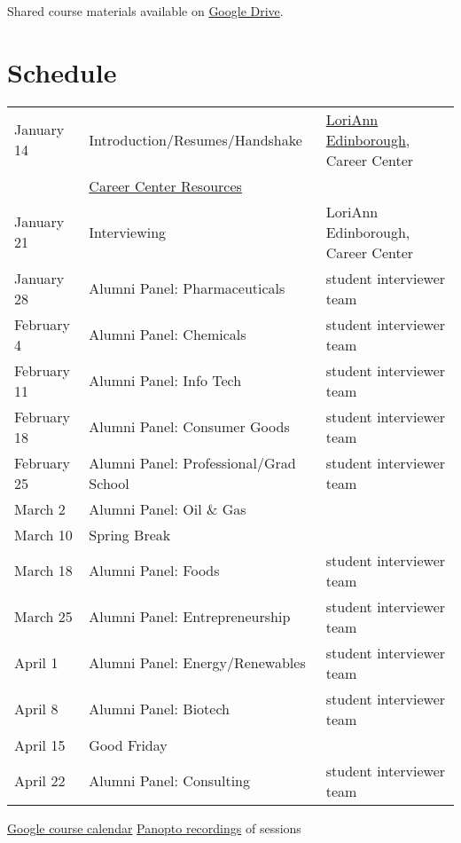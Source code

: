 \documentclass[11pt]{article}
\begin{document}
Shared course materials available on \href{https://drive.google.com/drive/folders/12p1B5icXV4FetwMoPTR7hkxTTPMj53qA?usp=sharing}{Google Drive}.

\section{Schedule}
\label{sec:orgf7111d6}
\begin{center}
\begin{tabular}{lll}
January 14 & Introduction/Resumes/Handshake & \href{https://www.linkedin.com/in/loriann-edinborough/}{LoriAnn Edinborough}, Career Center\\
 & \href{./Resources/Career-Center-Resources.pdf}{Career Center Resources} & \\
January 21 & Interviewing & LoriAnn Edinborough, Career Center\\
January 28 & Alumni Panel: Pharmaceuticals & student interviewer team\\
February 4 & Alumni Panel: Chemicals & student interviewer team\\
February 11 & Alumni Panel: Info Tech & student interviewer team\\
February 18 & Alumni Panel: Consumer Goods & student interviewer team\\
February 25 & Alumni Panel: Professional/Grad School & student interviewer team\\
March 2 & Alumni Panel: Oil \& Gas & \\
March 10 & Spring Break & \\
March 18 & Alumni Panel: Foods & student interviewer team\\
March 25 & Alumni Panel: Entrepreneurship & student interviewer team\\
April 1 & Alumni Panel: Energy/Renewables & student interviewer team\\
April 8 & Alumni Panel: Biotech & student interviewer team\\
April 15 & Good Friday & \\
April 22 & Alumni Panel: Consulting & student interviewer team\\
\end{tabular}
\end{center}

\href{https://calendar.google.com/calendar/u/0?cid=Y183NG02cDJnYWQ2NDQ4OTUzZGthaHJia2Nnc0Bncm91cC5jYWxlbmRhci5nb29nbGUuY29t}{Google course calendar}      \href{https://notredame.hosted.panopto.com/Panopto/Pages/Sessions/List.aspx?folderID=b93d46fc-da0a-4736-b7e1-acc1018685ee}{Panopto recordings} of sessions
\end{document}

